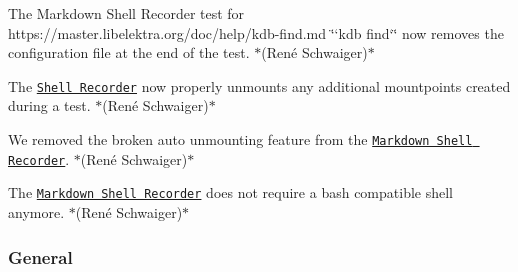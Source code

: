 \begin{DoxyItemize}
\item The Markdown Shell Recorder test for https\+://master.libelektra.\+org/doc/help/kdb-\/find.md \char`\"{}`kdb find`\char`\"{} now removes the configuration file at the end of the test. $\ast$(René Schwaiger)$\ast$
\item The \href{(https://master.libelektra.org/tests/shell/shell_recorder)}{\tt Shell Recorder} now properly unmounts any additional mountpoints created during a test. $\ast$(René Schwaiger)$\ast$
\item We removed the broken auto unmounting feature from the \href{https://master.libelektra.org/tests/shell/shell_recorder/tutorial_wrapper}{\tt Markdown Shell Recorder}. $\ast$(René Schwaiger)$\ast$
\item The \href{https://master.libelektra.org/tests/shell/shell_recorder/tutorial_wrapper}{\tt Markdown Shell Recorder} does not require a {\ttfamily bash} compatible shell anymore. $\ast$(René Schwaiger)$\ast$
\end{DoxyItemize}

\subsubsection*{General}


